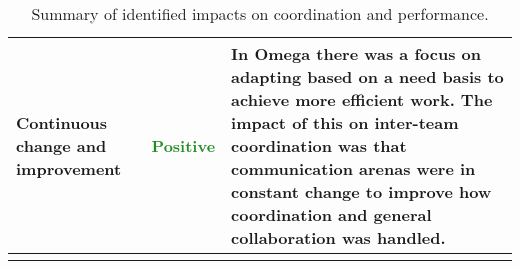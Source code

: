 \begin{center}
\begin{longtable}{| p{3.4cm} | p{1.25cm} | p{6.4cm} |}
	Continuous change and improvement & \textcolor{ForestGreen}{Positive} & In Omega there was a focus on adapting based on a need basis to achieve more efficient work. The impact of this on inter-team coordination was that communication arenas were in constant change to improve how coordination and general collaboration was handled. \\ \hline
	\caption{Summary of identified impacts on coordination and performance.}
	\label{conclusion_final}
	\end{longtable}
\end{center}
